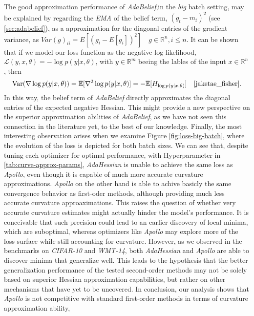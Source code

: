 The good approximation performance of \emph{AdaBelief},in the \emph{big} batch setting,  may be explained by regarding the \emph{EMA} of the belief term, $(g_t - m_t)^2$ (see \ref{sec:adabelief}), 
as a approximation for the diagonal entries of the gradient variance, as $Var(g)_{ii} = E[(g_i - E[g_i])^2] \quad g \in \mathbb{R}^n, i \leq n$.
It can be shown that if we model our loss function as the negative log-likelihood, $\mathcal{L}(y,x,\theta) = - \log p(y|x,\theta)$, with $y \in \mathbb{R}^m$ beeing the lables of the input $x\in \mathbb{R}^n$, then
\begin{equation}
    \text{Var}(\nabla \log p(y|x,\theta)) = \mathbb{E}[\nabla^2 \log p(y|x,\theta)] = - \mathbb{E}[H_{\log p(y|x,\theta)}] \quad \text{\cite{jaketae_fisher}}.
\end{equation}
In this way, the belief term of \emph{AdaBelief} directly approximates the diagonal entries of the expected negative Hessian.
This might provide a new perspective on the superior approximation abilities of \emph{AdaBelief},
as we have not seen this connection in the literature yet, to the best of our knowledge.
Finally, the most interesting observation arises when we examine Figure \ref{fig:loss-big-batch},
where the evolution of the loss is depicted for both batch sizes.
We can see that, despite tuning each optimizer for optimal performance, with Hyperparameter in \ref{tab:curve-approx-params}, \emph{AdaHessian} is unable to achieve the same loss as \emph{Apollo},
even though it is capable of much more accurate curvature approximations. \emph{Apollo} on the other hand is 
able to achive basicly the same convergence behavior as first-oder methods, although providing much less accurate curvature
approaximations.
This raises the question of whether very accurate curvature estimates might actually hinder
the model's performance. It is conceivable that such precision could lead to an
earlier discovery of local minima, which are suboptimal, whereas optimizers like
\emph{Apollo} may explore more of the loss surface while still accounting for curvature.
However, as we observed in the benchmarks on \emph{CIFAR-10} and \emph{WMT-14}, both \emph{AdaHessian} and \emph{Apollo} are able to discover minima that generalize well.
This leads to the hypothesis that the better generalization performance of the tested second-order
methods may not be solely based on superior Hessian approximation capabilities,
but rather on other mechanisms that have yet to be uncovered. In conclusion, our analysis shows that \emph{Apollo} is not competitive with standard first-order methods in terms of curvature approximation ability,
